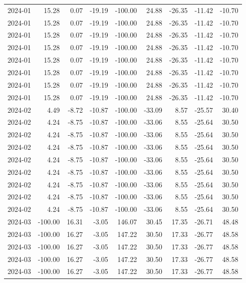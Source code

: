 \begin{table}[ht]
\begin{tabular}{lrrrrrrrr}
  2024-01 & 15.28 & 0.07 & -19.19 & -100.00 & 24.88 & -26.35 & -11.42 & -10.70 \\ 
  2024-01 & 15.28 & 0.07 & -19.19 & -100.00 & 24.88 & -26.35 & -11.42 & -10.70 \\ 
  2024-01 & 15.28 & 0.07 & -19.19 & -100.00 & 24.88 & -26.35 & -11.42 & -10.70 \\ 
  2024-01 & 15.28 & 0.07 & -19.19 & -100.00 & 24.88 & -26.35 & -11.42 & -10.70 \\ 
  2024-01 & 15.28 & 0.07 & -19.19 & -100.00 & 24.88 & -26.35 & -11.42 & -10.70 \\ 
  2024-01 & 15.28 & 0.07 & -19.19 & -100.00 & 24.88 & -26.35 & -11.42 & -10.70 \\ 
  2024-01 & 15.28 & 0.07 & -19.19 & -100.00 & 24.88 & -26.35 & -11.42 & -10.70 \\ 
  2024-01 & 15.28 & 0.07 & -19.19 & -100.00 & 24.88 & -26.35 & -11.42 & -10.70 \\ 
  2024-02 & 4.49 & -8.72 & -10.87 & -100.00 & -33.09 & 8.57 & -25.57 & 30.40 \\ 
  2024-02 & 4.24 & -8.75 & -10.87 & -100.00 & -33.06 & 8.55 & -25.64 & 30.50 \\ 
  2024-02 & 4.24 & -8.75 & -10.87 & -100.00 & -33.06 & 8.55 & -25.64 & 30.50 \\ 
  2024-02 & 4.24 & -8.75 & -10.87 & -100.00 & -33.06 & 8.55 & -25.64 & 30.50 \\ 
  2024-02 & 4.24 & -8.75 & -10.87 & -100.00 & -33.06 & 8.55 & -25.64 & 30.50 \\ 
  2024-02 & 4.24 & -8.75 & -10.87 & -100.00 & -33.06 & 8.55 & -25.64 & 30.50 \\ 
  2024-02 & 4.24 & -8.75 & -10.87 & -100.00 & -33.06 & 8.55 & -25.64 & 30.50 \\ 
  2024-02 & 4.24 & -8.75 & -10.87 & -100.00 & -33.06 & 8.55 & -25.64 & 30.50 \\ 
  2024-02 & 4.24 & -8.75 & -10.87 & -100.00 & -33.06 & 8.55 & -25.64 & 30.50 \\ 
  2024-03 & -100.00 & 16.31 & -3.05 & 146.07 & 30.45 & 17.35 & -26.71 & 48.48 \\ 
  2024-03 & -100.00 & 16.27 & -3.05 & 147.22 & 30.50 & 17.33 & -26.77 & 48.58 \\ 
  2024-03 & -100.00 & 16.27 & -3.05 & 147.22 & 30.50 & 17.33 & -26.77 & 48.58 \\ 
  2024-03 & -100.00 & 16.27 & -3.05 & 147.22 & 30.50 & 17.33 & -26.77 & 48.58 \\ 
  2024-03 & -100.00 & 16.27 & -3.05 & 147.22 & 30.50 & 17.33 & -26.77 & 48.58 \\ 

\end{tabular}
\end{table}
